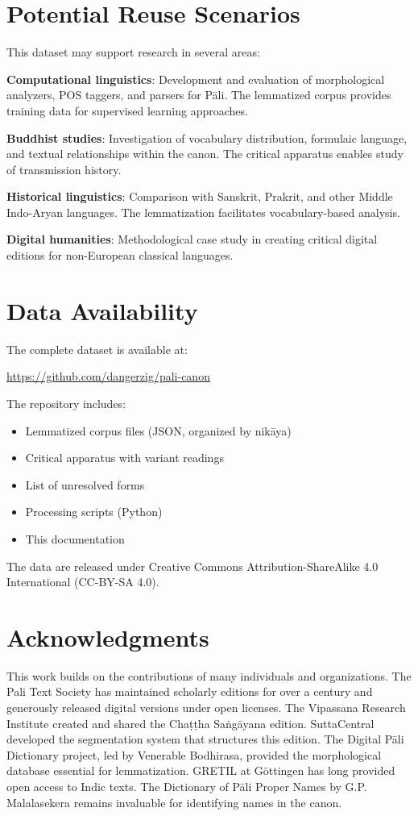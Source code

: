 \documentclass[12pt]{article}
\begin{document}
\section{Potential Reuse Scenarios}

This dataset may support research in several areas:

\textbf{Computational linguistics}: Development and evaluation of morphological analyzers, POS taggers, and parsers for Pāli. The lemmatized corpus provides training data for supervised learning approaches.

\textbf{Buddhist studies}: Investigation of vocabulary distribution, formulaic language, and textual relationships within the canon. The critical apparatus enables study of transmission history.

\textbf{Historical linguistics}: Comparison with Sanskrit, Prakrit, and other Middle Indo-Aryan languages. The lemmatization facilitates vocabulary-based analysis.

\textbf{Digital humanities}: Methodological case study in creating critical digital editions for non-European classical languages.

\section{Data Availability}

The complete dataset is available at:

\url{https://github.com/dangerzig/pali-canon}

The repository includes:
\begin{itemize}
\item Lemmatized corpus files (JSON, organized by nikāya)
\item Critical apparatus with variant readings
\item List of unresolved forms
\item Processing scripts (Python)
\item This documentation
\end{itemize}

The data are released under Creative Commons Attribution-ShareAlike 4.0 International (CC-BY-SA 4.0).

\section{Acknowledgments}

This work builds on the contributions of many individuals and organizations. The Pali Text Society has maintained scholarly editions for over a century and generously released digital versions under open licenses. The Vipassana Research Institute created and shared the Chaṭṭha Saṅgāyana edition. SuttaCentral developed the segmentation system that structures this edition. The Digital Pāli Dictionary project, led by Venerable Bodhirasa, provided the morphological database essential for lemmatization. GRETIL at Göttingen has long provided open access to Indic texts. The Dictionary of Pāli Proper Names by G.P. Malalasekera remains invaluable for identifying names in the canon.


\end{document}

